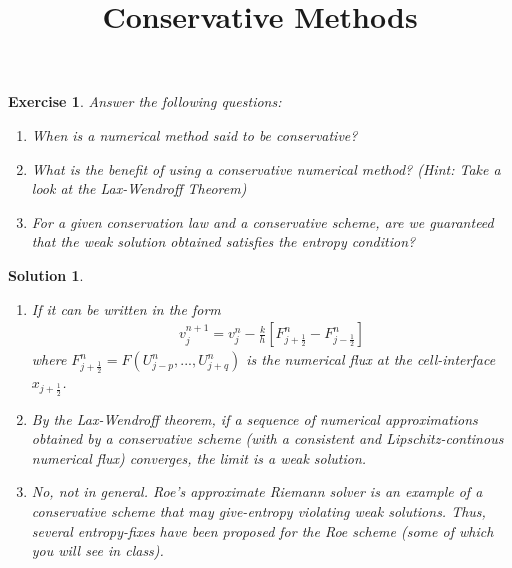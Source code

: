 \documentclass[10pt,letterpaper]{article}
\newcommand{\jph}{{j+\frac{1}{2}}}
\newcommand{\jmh}{{j-\frac{1}{2}}}
\theoremstyle{break}
\newtheorem{exercise}{Exercise}
\newtheorem{solution}{Solution}
\begin{document}
\title{Conservative Methods}
\date{}

\maketitle















\begin{exercise}
	Answer the following questions:
	\begin{enumerate}
		\item
		When is a numerical method said to be conservative?

		\item
		What is the benefit of using a conservative numerical method? (Hint: Take a look at the Lax-Wendroff Theorem)

		\item
		For a given conservation law and a conservative scheme, are we guaranteed that the weak solution obtained satisfies the entropy condition?
	\end{enumerate}
\end{exercise}

\begin{solution}
	\begin{enumerate}
		\item
		If it can be written in the form
		\begin{gather} \label{consForm}
			v_{j}^{n+1}=v_{j}^{n}-\frac{k}{h}\left[F^n_\jph-F^n_\jmh\right]
		\end{gather}
		where $F^n_\jph = F(U^n_{j-p},...,U^n_{j+q})$ is the numerical flux at the cell-interface $x_\jph$. 
		
		\item
		By the Lax-Wendroff theorem, if a sequence of numerical approximations obtained by a conservative scheme (with a consistent and Lipschitz-continous numerical flux) converges, the limit is a weak solution.
		
		\item
		No, not in general. Roe's approximate Riemann solver is an example of a conservative scheme that may give-entropy violating weak solutions. Thus, several \textit{entropy-fixes} have been proposed for the Roe scheme (some of which you will see in class).
	\end{enumerate}
\end{solution}
\end{document}
